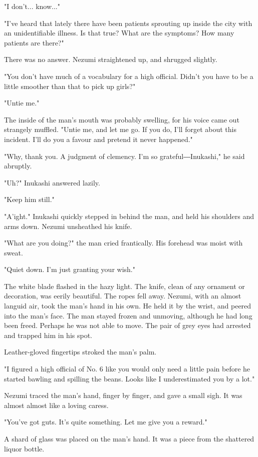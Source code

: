 "I don't... know..."

"I've heard that lately there have been patients sprouting up inside the
city with an unidentifiable illness. Is that true? What are the
symptoms? How many patients are there?"

There was no answer. Nezumi straightened up, and shrugged slightly.

"You don't have much of a vocabulary for a high official. Didn't you
have to be a little smoother than that to pick up girls?"

"Untie me."

The inside of the man's mouth was probably swelling, for his voice came
out strangely muffled. "Untie me, and let me go. If you do, I'll forget
about this incident. I'll do you a favour and pretend it never
happened."

"Why, thank you. A judgment of clemency. I'm so grateful―Inukashi," he
said abruptly.

"Uh?" Inukashi answered lazily.

"Keep him still."

"A'ight." Inukashi quickly stepped in behind the man, and held his
shoulders and arms down. Nezumi unsheathed his knife.

"What are you doing?" the man cried frantically. His forehead was moist
with sweat.

"Quiet down. I'm just granting your wish."

The white blade flashed in the hazy light. The knife, clean of any
ornament or decoration, was eerily beautiful. The ropes fell away.
Nezumi, with an almost languid air, took the man's hand in his own. He
held it by the wrist, and peered into the man's face. The man stayed
frozen and unmoving, although he had long been freed. Perhaps he was not
able to move. The pair of grey eyes had arrested and trapped him in his
spot.

Leather-gloved fingertips stroked the man's palm.

"I figured a high official of No. 6 like you would only need a little
pain before he started bawling and spilling the beans. Looks like I
underestimated you by a lot."

Nezumi traced the man's hand, finger by finger, and gave a small sigh.
It was almost almost like a loving caress.

"You've got guts. It's quite something. Let me give you a reward."

A shard of glass was placed on the man's hand. It was a piece from the
shattered liquor bottle.

